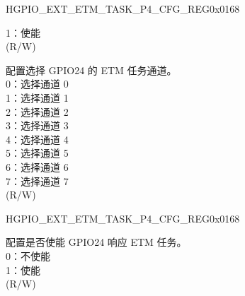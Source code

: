 \begin{register}{H}{GPIO\_EXT\_ETM\_TASK\_P4\_CFG\_REG}{0x0168}
\begin{regdesc}
\begin{reglist}
1：使能\\ (R/W)
\label{fielddesc:GPIOEXTETMTASKGPIO24SEL}\item [GPIO\_EXT\_ETM\_TASK\_GPIO24\_SEL] 配置选择 GPIO24 的 ETM 任务通道。\\
0：选择通道 0\\
1：选择通道 1\\
2：选择通道 2\\
3：选择通道 3\\
4：选择通道 4\\
5：选择通道 5\\
6：选择通道 6\\
7：选择通道 7\\ (R/W) 
\item [见下页]
\end{reglist}\end{regdesc}
\end{register}

\addtocounter{Regfloat}{-1}
\begin{register}{H}{GPIO\_EXT\_ETM\_TASK\_P4\_CFG\_REG}{0x0168}
\begin{regdesc}\begin{reglist}
\item [接上页]
\label{fielddesc:GPIOEXTETMTASKGPIO24EN}\item [GPIO\_EXT\_ETM\_TASK\_GPIO24\_EN] 配置是否使能 GPIO24 响应 ETM 任务。\\
0：不使能\\
1：使能\\ (R/W)
\end{reglist}\end{regdesc}
\end{register}



